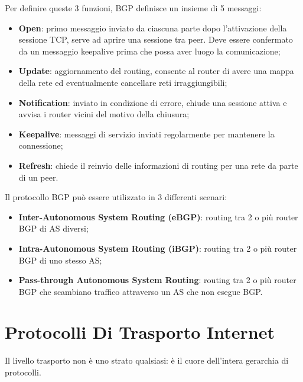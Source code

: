 \documentclass{article}
\begin{document}
        Per definire queste 3 funzioni, BGP definisce un insieme di 5 messaggi:

            \begin{itemize}
                \item \textbf{Open}: primo messaggio inviato da ciascuna parte dopo l’attivazione della sessione TCP,
                serve ad aprire una sessione tra peer. Deve essere confermato da un messaggio
                keepalive prima che possa aver luogo la comunicazione;
                \item \textbf{Update}: aggiornamento del routing, consente al router di avere una mappa della rete ed
                eventualmente cancellare reti irraggiungibili;
                \item \textbf{Notification}: inviato in condizione di errore, chiude una sessione attiva e avvisa i router
                vicini del motivo della chiusura;
                \item \textbf{Keepalive}: messaggi di servizio inviati regolarmente per mantenere la connessione;
                \item \textbf{Refresh}: chiede il reinvio delle informazioni di routing per una rete da parte di un peer.
            \end{itemize}

                
        Il protocollo BGP può essere utilizzato in 3 differenti scenari:

            \begin{itemize}
                \item \textbf{Inter-Autonomous System Routing (eBGP)}: routing tra 2 o più router BGP di AS
                diversi;
                \item \textbf{Intra-Autonomous System Routing (iBGP)}: routing tra 2 o più router BGP di uno
                stesso AS;
                \item \textbf{Pass-through Autonomous System Routing}: routing tra 2 o più router BGP che
                scambiano traffico attraverso un AS che non esegue BGP.
            \end{itemize}


    \section{Protocolli Di Trasporto Internet}
    Il livello trasporto non è uno strato qualsiasi: è il cuore dell’intera gerarchia di protocolli.\\
    
\end{document}
